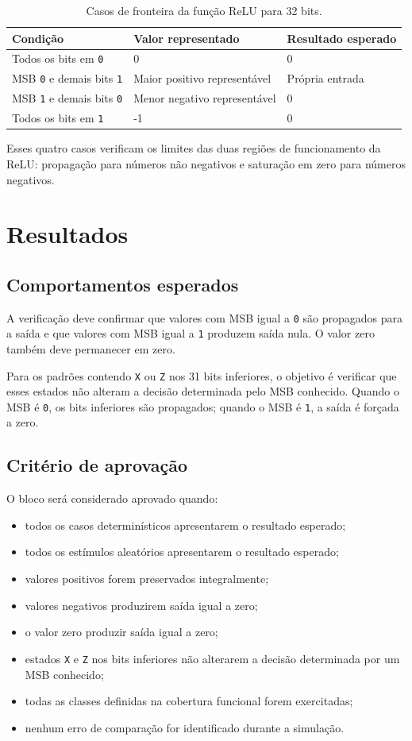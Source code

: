 \documentclass[12pt,a4paper]{article}
\begin{document}
\begin{table}[H]
\centering
\small
\begin{tabular}{|p{7cm}|p{5cm}|p{6cm}|}
\hline
\textbf{Condição} & \textbf{Valor representado} & \textbf{Resultado esperado} \\ \hline
Todos os bits em \texttt{0} & 0 & 0 \\ \hline
MSB \texttt{0} e demais bits \texttt{1} & Maior positivo representável & Própria entrada \\ \hline
MSB \texttt{1} e demais bits \texttt{0} & Menor negativo representável & 0 \\ \hline
Todos os bits em \texttt{1} & -1 & 0 \\ \hline
\end{tabular}
\caption{Casos de fronteira da função ReLU para 32 bits.}
\end{table}

Esses quatro casos verificam os limites das duas regiões de funcionamento da ReLU: propagação para números não negativos e saturação em zero para números negativos.

\section{Resultados}
\subsection{Comportamentos esperados}
A verificação deve confirmar que valores com MSB igual a \texttt{0} são propagados para a saída e que valores com MSB igual a \texttt{1} produzem saída nula. O valor zero também deve permanecer em zero.

Para os padrões contendo \texttt{X} ou \texttt{Z} nos 31 bits inferiores, o objetivo é verificar que esses estados não alteram a decisão determinada pelo MSB conhecido. Quando o MSB é \texttt{0}, os bits inferiores são propagados; quando o MSB é \texttt{1}, a saída é forçada a zero.

\subsection{Critério de aprovação}
O bloco será considerado aprovado quando:
\begin{itemize}
    \item todos os casos determinísticos apresentarem o resultado esperado;
    \item todos os estímulos aleatórios apresentarem o resultado esperado;
    \item valores positivos forem preservados integralmente;
    \item valores negativos produzirem saída igual a zero;
    \item o valor zero produzir saída igual a zero;
    \item estados \texttt{X} e \texttt{Z} nos bits inferiores não alterarem a decisão determinada por um MSB conhecido;
    \item todas as classes definidas na cobertura funcional forem exercitadas;
    \item nenhum erro de comparação for identificado durante a simulação.
\end{itemize}
\end{document}
